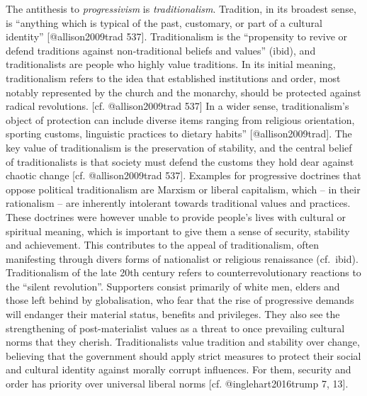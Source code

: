\documentclass[]{article}
\begin{document}
The antithesis to \emph{progressivism} is \emph{traditionalism}.
Tradition, in its broadest sense, is ``anything which is typical of the
past, customary, or part of a cultural identity'' {[}@allison2009trad
537{]}. Traditionalism is the ``propensity to revive or defend
traditions against non‐traditional beliefs and values'' (ibid), and
traditionalists are people who highly value traditions. In its initial
meaning, traditionalism refers to the idea that established institutions
and order, most notably represented by the church and the monarchy,
should be protected against radical revolutions. {[}cf. @allison2009trad
537{]} In a wider sense, traditionalism's object of protection can
include diverse items ranging from religious orientation, sporting
customs, linguistic practices to dietary habits''
{[}@allison2009trad{]}. The key value of traditionalism is the
preservation of stability, and the central belief of traditionalists is
that society must defend the customs they hold dear against chaotic
change {[}cf. @allison2009trad 537{]}. Examples for progressive
doctrines that oppose political traditionalism are Marxism or liberal
capitalism, which -- in their rationalism -- are inherently intolerant
towards traditional values and practices. These doctrines were however
unable to provide people's lives with cultural or spiritual meaning,
which is important to give them a sense of security, stability and
achievement. This contributes to the appeal of traditionalism, often
manifesting through divers forms of nationalist or religious renaissance
(cf.~ibid). Traditionalism of the late 20th century refers to
counterrevolutionary reactions to the ``silent revolution''. Supporters
consist primarily of white men, elders and those left behind by
globalisation, who fear that the rise of progressive demands will
endanger their material status, benefits and privileges. They also see
the strengthening of post-materialist values as a threat to once
prevailing cultural norms that they cherish. Traditionalists value
tradition and stability over change, believing that the government
should apply strict measures to protect their social and cultural
identity against morally corrupt influences. For them, security and
order has priority over universal liberal norms {[}cf.
@inglehart2016trump 7, 13{]}.
\end{document}
